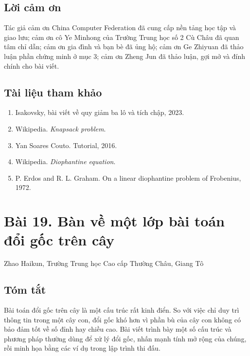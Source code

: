 \documentclass[11pt]{article}
\begin{document}
\subsection*{Lời cảm ơn}

Tác giả cảm ơn China Computer Federation đã cung cấp nền tảng học tập và giao
lưu; cảm ơn cô Ye Minhong của Trường Trung học số 2 Cù Châu đã quan tâm chỉ
dẫn; cảm ơn gia đình và bạn bè đã ủng hộ; cảm ơn Ge Zhiyuan đã thảo luận phần
chứng minh ở mục 3; cảm ơn Zheng Jun đã thảo luận, gợi mở và đính chính cho
bài viết.

\subsection*{Tài liệu tham khảo}

\begin{enumerate}
  \item Isakovsky, bài viết về quy giảm ba lô và tích chập, 2023.
  \item Wikipedia. \emph{Knapsack problem}.
  \item Yan Soares Couto. Tutorial, 2016.
  \item Wikipedia. \emph{Diophantine equation}.
  \item P. Erdos and R. L. Graham. On a linear diophantine problem of Frobenius,
  1972.
\end{enumerate}

\section*{Bài 19. Bàn về một lớp bài toán đổi gốc trên cây}

\begin{center}
Zhao Haikun, Trường Trung học Cao cấp Thường Châu, Giang Tô
\end{center}

\subsection*{Tóm tắt}

Bài toán đổi gốc trên cây là một cấu trúc rất kinh điển. So với việc chỉ duy
trì thông tin trong một cây con, đổi gốc khó hơn vì phần bù của cây con không
có bảo đảm tốt về số đỉnh hay chiều cao. Bài viết trình bày một số cấu trúc và
phương pháp thường dùng để xử lý đổi gốc, nhấn mạnh tính mở rộng của chúng, rồi
minh họa bằng các ví dụ trong lập trình thi đấu.
\end{document}
